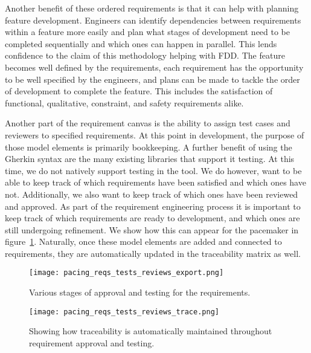 Another benefit of these ordered requirements is that it can help with planning feature development. Engineers can identify dependencies between requirements within a feature more easily and plan what stages of development need to be completed sequentially and which ones can happen in parallel. This lends confidence to the claim of this methodology helping with FDD. The feature becomes well defined by the requirements, each requirement has the opportunity to be well specified by the engineers, and plans can be made to tackle the order of development to complete the feature. This includes the satisfaction of functional, qualitative, constraint, and safety requirements alike.

Another part of the requirement canvas is the ability to assign test cases and reviewers to specified requirements. At this point in development, the purpose of those model elements is primarily bookkeeping. A further benefit of using the Gherkin syntax are the many existing libraries that support it testing. At this time, we do not natively support testing in the tool. We do however, want to be able to keep track of which requirements have been satisfied and which ones have not. Additionally, we also want to keep track of which ones have been reviewed and approved. As part of the requirement engineering process it is important to keep track of which requirements are ready to development, and which ones are still undergoing refinement. We show how this can appear for the pacemaker in figure~\ref{fig:pacing_reqs_tests_reviews_export}. Naturally, once these model elements are added and connected to requirements, they are automatically updated in the traceability matrix as well.


\begin{figure}
	\centering
	\texttt{[image: pacing\_reqs\_tests\_reviews\_export.png]}
	\caption{Various stages of approval and testing for the requirements.}
	\label{fig:pacing_reqs_tests_reviews_export}
\end{figure}

\begin{figure}
	\centering
	\texttt{[image: pacing\_reqs\_tests\_reviews\_trace.png]}
	\caption{Showing how traceability is automatically maintained throughout requirement approval and testing.}
	\label{fig:pacing_reqs_tests_reviews_trace}
\end{figure}

